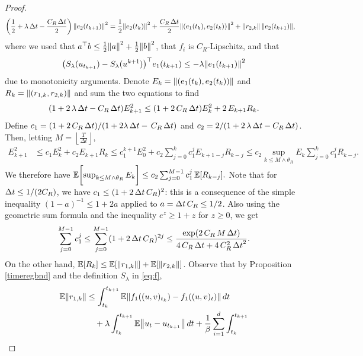 \documentclass[11pt, twoside]{report}
\begin{document}
\begin{proof}
\begin{align*}
   \left(\frac12+\lambda \,\deltat - \frac{C_R\,\tstep}{2} \right) \norm{e_2(t_{k+1})}^2 &= \frac12 \norm{e_2(t_{k})}^2+   \frac{C_R\,\tstep }{2} \norm{(e_1(t_{k}),e_2(t_{k}))}^2   + \norm{r_{2,k}}\,\norm{e_2(t_{k+1})},
\end{align*}
where we used that
 ${a^\top}{b}\leq \frac12 \norm{a}^2 + \frac12 \norm{b}^2$, that $f_i$ is $C_R$-Lipschitz, and that  $$\bigl(S_\lambda(u_{t_{k+1}}) - S_\lambda(u^{k+1})\bigr)^\top e_1(t_{k+1}) \leq -\lambda \norm{e_1(t_{k+1})}^2$$
 due to monotonicity arguments. Denote $E_k = \left\lVert(e_1(t_{k}),e_2(t_k)) \right\rVert$ and  $R_k= \left\lVert(r_{1,k},r_{2,k})\right\rVert$ and sum the two equations to find 
\begin{align*}
    \pa{1 + 2\,\lambda \,\deltat -  C_R\,\tstep} E_{k+1}^2 \leq \pa{1+ 2\,C_R \,\deltat } E_k^2 +   2\,E_{k+1} R_k .
\end{align*}
Define $c_1 = \pa{1+ 2\,C_R\, \deltat }/ \pa{1 + 2\lambda\, \deltat - \,C_R\,\tstep}$ and $c_2 = 2/ \pa{1 + 2\,\lambda\, \deltat -  C_R\,\tstep}$. Then, letting $M=\left\lfloor\frac{T}{\Delta t}\right\rfloor$,
\begin{align*}
    E_{k+1}^2 &\leq c_1 E_k^2 + c_2 E_{k+1} R_k \leq c_1^{k+1} E_{0}^2 + c_2 \sum_{j=0}^{k} c_1^j  E_{k+1-j} R_{k-j}\leq c_2 \sup_{k\leq M\wedge \theta_R} E_k \sum_{j=0}^{k} c_1^j   R_{k-j}.
 \end{align*}
 We therefore have
 $
 \mathbb{E}\biggl[\sup_{k\leq M \wedge\theta_R} E_k\biggr]\leq c_2 \sum_{j=0}^{M-1} c_1^j \,\mathbb{E}[R_{k-j}].
 $
 Note that for ${\Delta t} \leq 1/(2C_R)$, we have $c_1\leq (1+2\,{\Delta t}\, C_R)^2$: this is a consequence of the simple inequality $(1-a)^{-1}\leq 1 + 2a$ applied to $a = {\Delta t}\, C_R \leq 1/2$.
Also using the geometric sum formula and the inequality $e^z \geq 1 + z$ for $z\geq 0$, we get
  $$\sum_{j=0}^{M-1} c_1^j \leq \sum_{j=0}^{M-1}  (1+ 2\,{\Delta t} \,C_R)^{2j} \le\frac{\exp(2\, C_R\,M\,{\Delta t})}{4\, C_R\,{\Delta t} +  4\,C_R^2\,{\Delta t}^2}.$$ 
 On the other hand, $ \mathbb{E}[R_k] \leq \mathbb{E}[\left\lVert r_{1,k}\right\rVert] + \mathbb{E}[\left\lVert r_{2,k}\right\rVert]$.
 Observe that by Proposition \ref{timeregbnd} and the definition $S_\lambda$ in \eqref{eq:f},
\begin{align*}
   \EE \norm{r_{1,k}}
   &\leq \int_{t_k}^{t_{k+1}} \EE\norm{f_1((u,v)_{t_k}) - f_1((u,v)_t)} \,dt \\
    &\quad+ \lambda \int_{t_k}^{t_{k+1}} \EE \norm{u_t - u_{t_{k+1}}}\, dt
    +\frac{1}{\beta} \sum_{i=1}^d  \int_{t_k}^{t_{k+1}}

\end{align*}
\end{proof}
\end{document}
